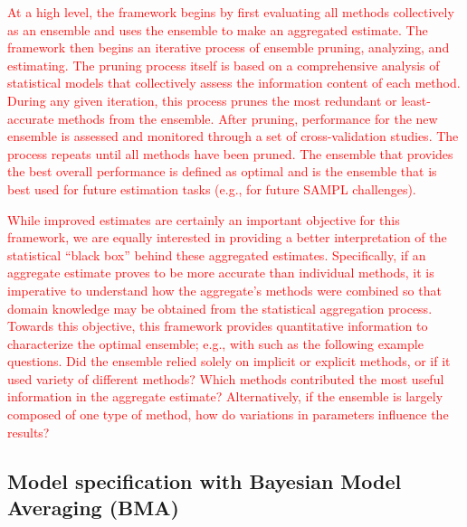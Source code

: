 \documentclass[journal=jpcbfk, manuscript=article]{achemso}
\newcommand{\+}[1]{\ensuremath{\mathbf{#1}}}
\newcommand{\rev}[1]{\textsf{\textcolor{red}{#1}}}
\begin{document}
\rev{At a high level, the framework begins by first evaluating all methods collectively as an ensemble and uses the ensemble to make an aggregated estimate. 
The framework then begins an iterative process of ensemble pruning, analyzing, and estimating.
The pruning process itself is based on a comprehensive analysis of statistical models that collectively assess the information content of each method.
During any given iteration, this process prunes the most redundant or least-accurate methods from the ensemble.
After pruning, performance for the new ensemble is assessed and monitored through a set of cross-validation studies.
The process repeats until all methods have been pruned.
The ensemble that provides the best overall performance is defined as optimal and is the ensemble that is best used for future estimation tasks (e.g., for future SAMPL challenges).}

\rev{While improved estimates are certainly an important objective for this framework, we are equally interested in providing a better interpretation of the statistical ``black box'' behind these aggregated estimates. 
Specifically, if an aggregate estimate proves to be more accurate than individual methods, it is imperative to understand how the aggregate's methods were combined so that domain knowledge may be obtained from the statistical aggregation process.
Towards this objective, this framework provides quantitative information to characterize the optimal ensemble; e.g., with such as the following example questions.  Did the ensemble relied solely on implicit or explicit methods, or if it used variety of different methods?
Which methods contributed the most useful information in the aggregate estimate?
Alternatively, if the ensemble is largely composed of one type of method, how do variations in parameters influence the results?}


\subsection{Model specification with Bayesian Model Averaging (BMA)} \label{Method} 
\end{document}
